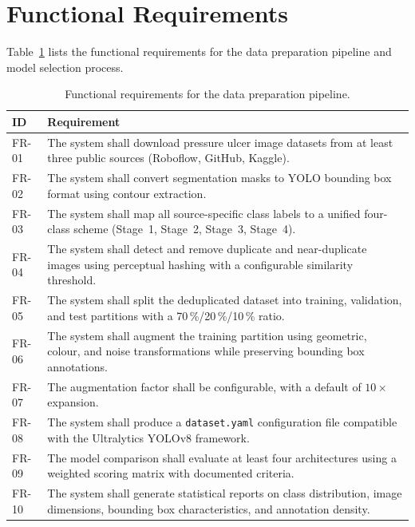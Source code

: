 \documentclass[a4paper,12pt,twoside]{report}
\begin{document}
\section{Functional Requirements}
\label{sec:func-req}

Table~\ref{tab:functional-req} lists the functional requirements for the data
preparation pipeline and model selection process.

\begin{table}[htbp]
  \centering
  \caption{Functional requirements for the data preparation pipeline.}
  \label{tab:functional-req}
  \begin{tabularx}{\textwidth}{lX}
    \toprule
    \textbf{ID} & \textbf{Requirement} \\
    \midrule
    FR-01 & The system shall download pressure ulcer image datasets from at least
            three public sources (Roboflow, GitHub, Kaggle). \\
    FR-02 & The system shall convert segmentation masks to YOLO bounding box
            format using contour extraction. \\
    FR-03 & The system shall map all source-specific class labels to a unified
            four-class scheme (Stage~1, Stage~2, Stage~3, Stage~4). \\
    FR-04 & The system shall detect and remove duplicate and near-duplicate
            images using perceptual hashing with a configurable similarity
            threshold. \\
    FR-05 & The system shall split the deduplicated dataset into training,
            validation, and test partitions with a 70\,\%/20\,\%/10\,\% ratio. \\
    FR-06 & The system shall augment the training partition using geometric,
            colour, and noise transformations while preserving bounding box
            annotations. \\
    FR-07 & The augmentation factor shall be configurable, with a default of
            $10\times$ expansion. \\
    FR-08 & The system shall produce a \texttt{dataset.yaml} configuration file
            compatible with the Ultralytics YOLOv8 framework. \\
    FR-09 & The model comparison shall evaluate at least four architectures using
            a weighted scoring matrix with documented criteria. \\
    FR-10 & The system shall generate statistical reports on class distribution,
            image dimensions, bounding box characteristics, and annotation
            density. \\
    \bottomrule
  \end{tabularx}
\end{table}
\end{document}
